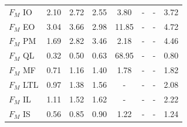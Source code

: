 \begin{table}[h]
\begin{tabular}{lccccccc}
$F_M$ IO & 2.10 & 2.72 & 2.55 & 3.80 & - & - & 3.72 \\
$F_M$ EO & 3.04 & 3.66 & 2.98 & 11.85 & - & - & 4.72 \\
$F_M$ PM & 1.69 & 2.82 & 3.46 & 2.18 & - & - & 4.46 \\
$F_M$ QL & 0.32 & 0.50 & 0.63 & 68.95 & - & - & 0.80 \\
$F_M$ MF & 0.71 & 1.16 & 1.40 & 1.78 & - & - & 1.82 \\
$F_M$ LTL & 0.97 & 1.38 & 1.56 & - & - & - & 2.08 \\
$F_M$ IL & 1.11 & 1.52 & 1.62 & - & - & - & 2.22 \\
$F_M$ IS & 0.56 & 0.85 & 0.90 & 1.22 & - & - & 1.24 \\
\bottomrule
\end{tabular}
\end{table}
